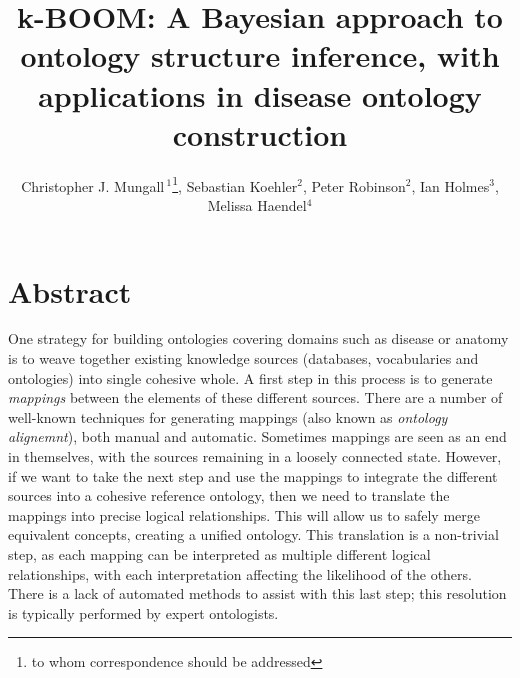 \documentclass{my}
\begin{document}

\title{k-BOOM: A Bayesian approach to ontology structure inference, with applications in disease ontology construction}

\author{Christopher J. Mungall\,$^{1}$\footnote{to whom correspondence should be addressed},
  Sebastian Koehler$^{2}$,
  Peter Robinson$^{2}$,
  Ian Holmes$^{3}$,
  Melissa Haendel$^{4}$
}
\address{
  $^{1}$Environmental Genomics and Systems Biology Division, Lawrence Berkeley National Laboratory, MS977, 1 Cyclotron Road, Berkeley, CA 94720 USA\\
  $^{2}$Institute for Medical and Human Genetics, Charit\'{e}-Universit\"atsmedizin Berlin, Augustenburger Platz 1, 13353 Berlin, Germany. \\
  $^{3}$Department of Bioengineering, University of California, Berkeley, CA, USA \\
  $^{4}$Department of Medical Informatics \& Clinical Epidemiology, Oregon Health and Sciences University, Portland, Oregon, USA
}

\history{}

\editor{}

\maketitle

\section*{Abstract}

One strategy for building ontologies covering domains such as disease
or anatomy is to weave together existing knowledge sources (databases,
vocabularies and ontologies) into single cohesive whole. A first step
in this process is to generate \emph{mappings} between the elements of
these different sources. There are a number of well-known techniques
for generating mappings (also known as \emph{ontology alignemnt}),
both manual and automatic\cite{otero2015ontology}. Sometimes mappings are seen as an end in
themselves, with the sources remaining in a loosely connected
state. However, if we want to take the next step and use the mappings
to integrate the different sources into a cohesive reference
ontology, then we need to translate the mappings into precise logical
relationships. This will allow us to safely merge equivalent concepts,
creating a unified ontology. This translation is a non-trivial step,
as each mapping can be interpreted as multiple different logical
relationships, with each interpretation affecting the likelihood of
the others. There is a lack of automated methods to assist with this
last step; this resolution is typically performed by expert
ontologists.
\end{document}

